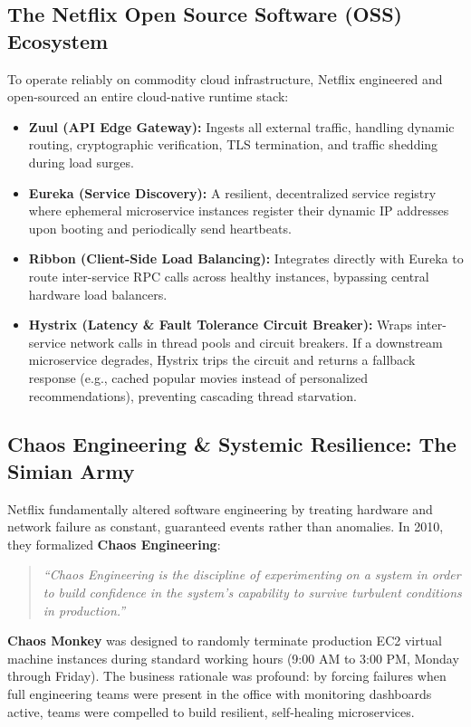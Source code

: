 \documentclass[11pt,a4paper]{article}
\begin{document}
\subsection{The Netflix Open Source Software (OSS) Ecosystem}
To operate reliably on commodity cloud infrastructure, Netflix engineered and open-sourced an entire cloud-native runtime stack:
\begin{itemize}[leftmargin=*]
    \item \textbf{Zuul (API Edge Gateway):} Ingests all external traffic, handling dynamic routing, cryptographic verification, TLS termination, and traffic shedding during load surges.
    \item \textbf{Eureka (Service Discovery):} A resilient, decentralized service registry where ephemeral microservice instances register their dynamic IP addresses upon booting and periodically send heartbeats.
    \item \textbf{Ribbon (Client-Side Load Balancing):} Integrates directly with Eureka to route inter-service RPC calls across healthy instances, bypassing central hardware load balancers.
    \item \textbf{Hystrix (Latency \& Fault Tolerance Circuit Breaker):} Wraps inter-service network calls in thread pools and circuit breakers. If a downstream microservice degrades, Hystrix trips the circuit and returns a fallback response (e.g., cached popular movies instead of personalized recommendations), preventing cascading thread starvation.
\end{itemize}

\subsection{Chaos Engineering \& Systemic Resilience: The Simian Army}
Netflix fundamentally altered software engineering by treating hardware and network failure as constant, guaranteed events rather than anomalies. In 2010, they formalized \textbf{Chaos Engineering}:
\begin{quote}
\textit{``Chaos Engineering is the discipline of experimenting on a system in order to build confidence in the system's capability to survive turbulent conditions in production.''}
\end{quote}

\textbf{Chaos Monkey} was designed to randomly terminate production EC2 virtual machine instances during standard working hours (9:00 AM to 3:00 PM, Monday through Friday). The business rationale was profound: by forcing failures when full engineering teams were present in the office with monitoring dashboards active, teams were compelled to build resilient, self-healing microservices. 
\end{document}
